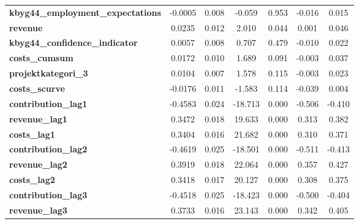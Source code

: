 \begin{center}
\begin{tabular}{lcccccc}
\textbf{kbyg44\_employment\_expectations}   &      -0.0005  &        0.008     &    -0.059  &         0.953        &       -0.016    &        0.015     \\
\textbf{revenue}                            &       0.0235  &        0.012     &     2.010  &         0.044        &        0.001    &        0.046     \\
\textbf{kbyg44\_confidence\_indicator}      &       0.0057  &        0.008     &     0.707  &         0.479        &       -0.010    &        0.022     \\
\textbf{costs\_cumsum}                      &       0.0172  &        0.010     &     1.689  &         0.091        &       -0.003    &        0.037     \\
\textbf{projektkategori\_3}                 &       0.0104  &        0.007     &     1.578  &         0.115        &       -0.003    &        0.023     \\
\textbf{costs\_scurve}                      &      -0.0176  &        0.011     &    -1.583  &         0.114        &       -0.039    &        0.004     \\
\textbf{contribution\_lag1}                 &      -0.4583  &        0.024     &   -18.713  &         0.000        &       -0.506    &       -0.410     \\
\textbf{revenue\_lag1}                      &       0.3472  &        0.018     &    19.633  &         0.000        &        0.313    &        0.382     \\
\textbf{costs\_lag1}                        &       0.3404  &        0.016     &    21.682  &         0.000        &        0.310    &        0.371     \\
\textbf{contribution\_lag2}                 &      -0.4619  &        0.025     &   -18.501  &         0.000        &       -0.511    &       -0.413     \\
\textbf{revenue\_lag2}                      &       0.3919  &        0.018     &    22.064  &         0.000        &        0.357    &        0.427     \\
\textbf{costs\_lag2}                        &       0.3418  &        0.017     &    20.127  &         0.000        &        0.308    &        0.375     \\
\textbf{contribution\_lag3}                 &      -0.4518  &        0.025     &   -18.423  &         0.000        &       -0.500    &       -0.404     \\
\textbf{revenue\_lag3}                      &       0.3733  &        0.016     &    23.143  &         0.000        &        0.342    &        0.405     \\

\end{tabular}
\end{center}
